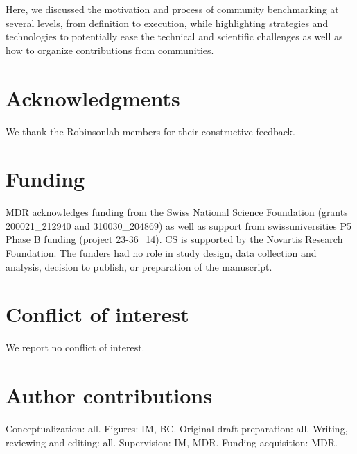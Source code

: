 \documentclass[11pt]{article}
\begin{document}
Here, we discussed the motivation and process of community benchmarking at several levels, from definition to execution, while highlighting strategies and technologies to potentially ease the technical and scientific challenges as well as how to organize contributions from communities. 


\section*{Acknowledgments} 

We thank the Robinsonlab members for their constructive feedback.

\section*{Funding}
MDR acknowledges funding from the Swiss National Science Foundation (grants 200021\_212940 and 310030\_204869) as well as support from swissuniversities P5 Phase B funding (project 23-36\_14). CS is supported by the Novartis Research Foundation. The funders had no role in study design, data collection and analysis, decision to publish, or preparation of the manuscript.

\section*{Conflict of interest}

We report no conflict of interest.

\section*{Author contributions}

Conceptualization: all. Figures: IM, BC. Original draft preparation: all. Writing, reviewing and editing: all. Supervision: IM, MDR. Funding acquisition: MDR.


\end{document}
